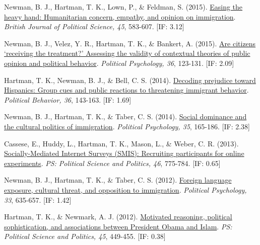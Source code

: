 \documentclass[12pt]{article}
\begin{document}
\begin{bibenum}
    \item Newman, B. J., {Hartman, T. K.}, Lown, P., \& Feldman, S. (2015). 
          \href{https://10.1017/S0007123413000410}
          {Easing the heavy hand: Humanitarian concern, empathy, and 
          opinion on immigration}. 
          \emph{British Journal of Political Science, 45}, 583-607. [IF: 3.12]
           
    \item *Newman, B. J., Velez, Y. R., {Hartman, T. K.}, \& Bankert, A. (2015). 
          \href{https://10.1111/pops.12069}
          {Are citizens `receiving the treatment?' Assessing the validity 
          of contextual theories of public opinion and political behavior}. 
          \emph{Political Psychology, 36}, 123-131. [IF: 2.09]

    \item {Hartman, T. K.}, Newman, B. J., \& Bell, C. S. (2014). 
          \href{https://10.1007/s11109-013-9231-7}
          {Decoding prejudice toward Hispanics: 
			Group cues and public reactions to threatening immigrant behavior}.
          \emph{Political Behavior, 36}, 143-163. [IF: 1.69]
  
    \item *Newman, B. J., {Hartman, T. K.}, \& Taber, C. S. (2014). 
          \href{https://10.1111/pops.12047}
          {Social dominance and the cultural politics of immigration}. 
          \emph{Political Psychology, 35}, 165-186. [IF: 2.38]

    \item Cassese, E., Huddy, L., {Hartman, T. K.}, Mason, L., 
          \& Weber, C. R. (2013). 
          \href{https://10.1017/S1049096513001029}
          {Socially-Mediated Internet Surveys (SMIS): 
          Recruiting participants for online experiments}. 
          \emph{PS: Political Science and Politics, 46}, 775-784. [IF: 0.65]

    \item Newman, B. J., {Hartman, T. K.}, \& Taber, C. S. (2012). 
          \href{https://10.1111/j.1467-9221.2012.00904.x}
          {Foreign language exposure, cultural threat, and opposition to immigration}. 
          \emph{Political Psychology, 33}, 635-657. [IF: 1.42]

    \item {Hartman, T. K.}, \& Newmark, A. J. (2012). 
          \href{https://10.1017/S1049096512000327}
          {Motivated reasoning, political sophistication, 
          and associations between President Obama and Islam}. 
          \emph{PS: Political Science and Politics, 45}, 449-455. [IF: 0.38]


\end{bibenum}
\end{document}
